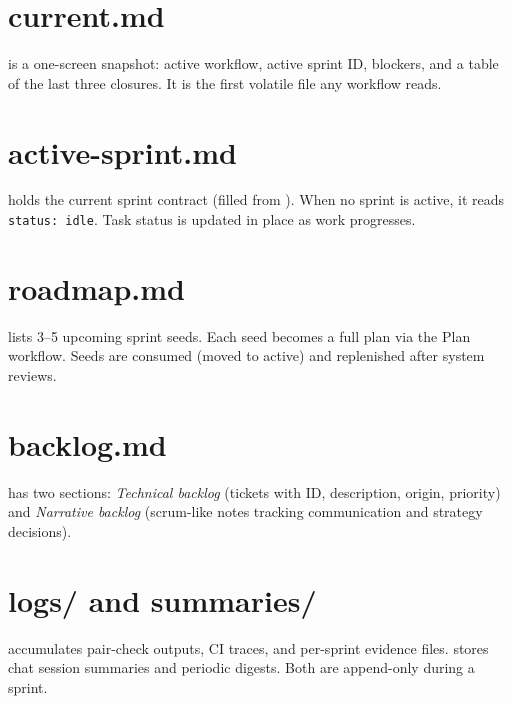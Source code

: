 \documentclass[a4paper,11pt,openany]{report}
\begin{document}
\section{current.md}

 is a one-screen snapshot: active workflow, active
sprint ID, blockers, and a table of the last three closures. It is the first
volatile file any workflow reads.

\section{active-sprint.md}

 holds the current sprint contract (filled from
). When no sprint is active, it reads
\texttt{status: idle}. Task status is updated in place as work progresses.

\section{roadmap.md}

 lists 3--5 upcoming sprint seeds. Each seed becomes
a full plan via the Plan workflow. Seeds are consumed (moved to active) and
replenished after system reviews.

\section{backlog.md}

 has two sections: \emph{Technical backlog} (tickets
with ID, description, origin, priority) and \emph{Narrative backlog} (scrum-like
notes tracking communication and strategy decisions).

\section{logs/ and summaries/}

 accumulates pair-check outputs, CI traces, and per-sprint
evidence files.  stores chat session summaries and
periodic digests. Both are append-only during a sprint.



\end{document}
